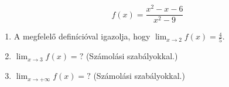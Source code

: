 \documentclass[11pt]{scrartcl}
\begin{document}
\[
	f(x) = \frac{x^2 - x - 6}{x^2 - 9}
\]
\begin{enumerate}
	\item A megfelelő definícióval igazolja, hogy
	      \(\displaystyle \lim_{x \to 2} f(x) = \frac{4}{5}\).

	\item \(\displaystyle \lim_{x \to 3} f(x) = ?\) (Számolási szabályokkal.)

	\item \(\displaystyle \lim_{x \to +\infty} f(x) = ?\) (Számolási
	      szabályokkal.)
\end{enumerate}
\end{document}
